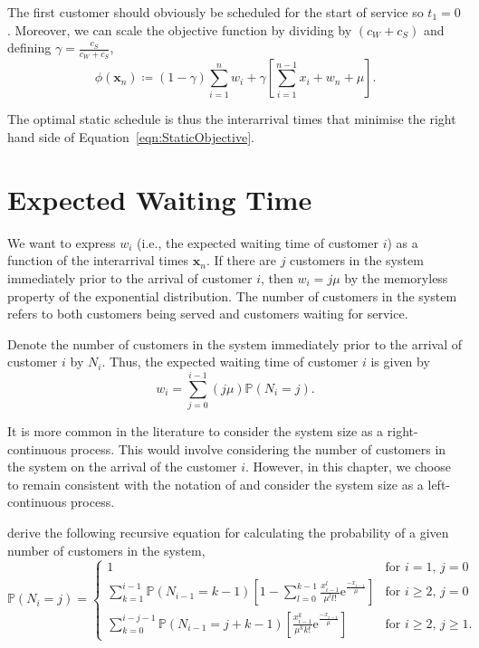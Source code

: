 The first customer should obviously be scheduled for the start of service so $t_{1} = 0$. Moreover, we can scale the objective function by dividing by $(c_{W} + c_{S})$ and defining $\gamma = \frac{c_{S}}{c_{W} + c_{S}}$,
\begin{equation}
	\phi (\mathbf{x}_{n}) \coloneqq (1 - \gamma) \sum_{i = 1}^{n} w_{i} + \gamma \left[ \sum_{i = 1}^{n - 1} x_{i} + w_{n} + \mu \right].
	\label{eqn:StaticObjective}
\end{equation}

The optimal static schedule is thus the interarrival times that minimise the right hand side of Equation~\ref{eqn:StaticObjective}.

\section{Expected Waiting Time}
We want to express $w_{i}$ (i.e., the expected waiting time of customer $i$) as a function of the interarrival times $\mathbf{x}_{n}$. If there are $j$ customers in the system immediately prior to the arrival of customer $i$, then $w_{i} = j \mu$ by the memoryless property of the exponential distribution. The number of customers in the system refers to both customers being served and customers waiting for service.

Denote the number of customers in the system immediately prior to the arrival of customer $i$ by $N_{i}$. Thus, the expected waiting time of customer $i$ is given by
\begin{equation}
	w_{i} = \sum_{j = 0}^{i - 1} (j \mu) \mathbb{P} (N_{i} = j).
\end{equation}

It is more common in the literature to consider the system size as a right-continuous process. This would involve considering the number of customers in the system on the arrival of the customer $i$. However, in this chapter, we choose to remain consistent with the notation of \citet{Pegden} and consider the system size as a left-continuous process.

\citet{Pegden} derive the following recursive equation for calculating the probability of a given number of customers in the system,
\begin{equation}
	\mathbb{P} (N_{i} = j) = \begin{cases} 1 & \text{for $i = 1$, $j = 0$} \\
	\sum_{k = 1}^{i - 1} \mathbb{P} (N_{i - 1} = k - 1) \left[ 1 - \sum_{l = 0}^{k - 1} \frac{x_{i - 1}^{l}}{\mu^{l} l!} \mathrm{e}^{\frac{- x_{i - 1}}{\mu}}\right] & \text{for $i \geq 2$, $j = 0$} \\
	\sum_{k = 0}^{i - j - 1} \mathbb{P} (N_{i - 1} = j + k - 1) \left[ \frac{x_{i - 1}^{k}}{\mu^{k} k!} \mathrm{e}^{\frac{- x_{i - 1}}{\mu}} \right] & \text{for $i \geq 2$, $j \geq 1$}. \end{cases}
	\label{eqn:StaticProbSystem}
\end{equation}

